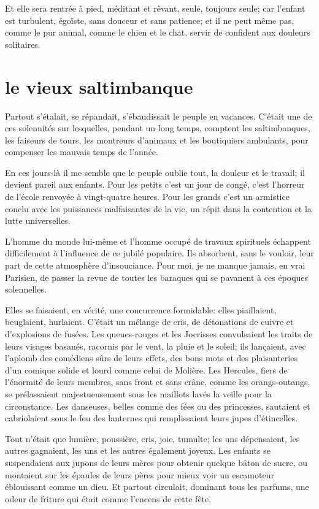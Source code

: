 Et elle sera rentrée à pied, méditant et rêvant, seule, toujours seule;
car l’enfant est turbulent, égoïste, sans douceur et
sans patience; et il ne peut même pas, comme le pur animal, comme le
chien et le chat, servir de confident aux douleurs solitaires.

\quebra\section[Le vieux saltimbanque]{le vieux saltimbanque}

Partout s’étalait, se répandait,
s’ébaudissait le peuple en vacances.
C’était une de ces solennités sur lesquelles, pendant
un long temps, comptent les saltimbanques, les faiseurs de tours, les
montreurs d’animaux et les boutiquiers ambulants, pour
compenser les mauvais temps de l’année.

En ces jours{}-là il me semble que le peuple oublie tout, la douleur et
le travail; il devient pareil aux enfants. Pour les petits
c’est un jour de congé, c’est
l’horreur de l’école renvoyée à
vingt{}-quatre heures. Pour les grands c’est un
armistice conclu avec les puissances malfaisantes de la vie, un répit
dans la contention et la lutte universelles.

L’homme du monde lui{}-même et l’homme
occupé de travaux spirituels échappent difficilement à
l’influence de ce jubilé populaire. Ils absorbent,
sans le vouloir, leur part de cette atmosphère
d’insouciance. Pour moi, je ne manque jamais, en vrai
Parisien, de passer la revue de toutes les baraques qui se pavanent à
ces époques solennelles.

Elles se faisaient, en vérité, une concurrence formidable: elles
piaillaient, beuglaient, hurlaient. C’était un mélange
de cris, de détonations de cuivre et d’explosions de
fusées. Les queues{}-rouges et les Jocrisses convulsaient les traits de
leurs visages basanés, racornis par le vent, la pluie et le soleil; ils
lançaient, avec l’aplomb des comédiens sûrs de leurs
effets, des bons mots et des plaisanteries d’un
comique solide et lourd comme celui de Molière. Les Hercules, fiers de
l’énormité de leurs membres, sans front et sans crâne,
comme les orangs{}-outangs, se prélassaient majestueusement sous les
maillots lavés la veille pour la circonstance. Les danseuses, belles
comme des fées ou des princesses, sautaient et cabriolaient sous le feu
des lanternes qui remplissaient leurs jupes
d’étincelles.

Tout n’était que lumière, poussière, cris, joie,
tumulte; les uns dépensaient, les autres gagnaient, les uns et les
autres également joyeux. Les enfants se suspendaient aux jupons de
leurs mères pour obtenir quelque bâton de sucre, ou montaient sur les
épaules de leurs pères pour mieux voir un escamoteur éblouissant comme
un dieu. Et partout circulait, dominant tous les parfums, une odeur de
friture qui était comme l’encens de cette fête.

